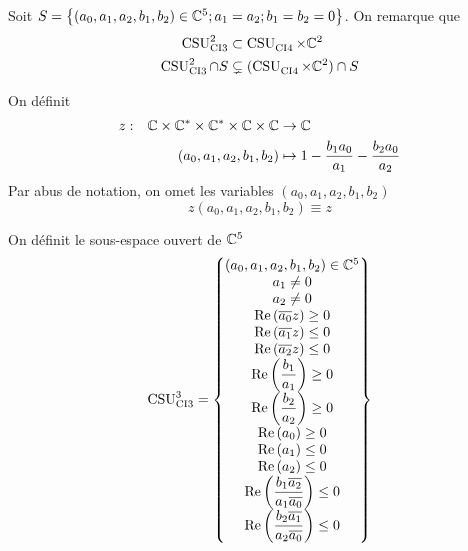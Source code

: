   Soit \(S = \left\lbrace (a_0,a_1,a_2,b_1,b_2) \in \CC^5 ; a_1 = a_2 ; b_1 = b_2 = 0 \right\rbrace \). On remarque que
  \begin{align}
    \CSU[2]{CI3} & \subset \CSU{CI4}\times\CC^2
    \\
    \CSU[2]{CI3}\cap S & \subsetneq (\CSU{CI4}\times\CC^2)\cap S 
  \end{align}

    On définit 
    \begin{equation}
      \label{eq:fonction:z-ci3}
      \fonction{z}{\CC\times\CC^*\times\CC^*\times \CC \times \CC}{\CC}%
        {(a_0,a_1,a_2,b_1,b_2)}{1 - \frac{b_1a_0}{a_1} - \frac{b_2a_0}{a_2}}
    \end{equation}
    Par abus de notation, on omet les variables \( (a_0,a_1,a_2,b_1,b_2)\)
    \begin{equation}
       z(a_0,a_1,a_2,b_1,b_2) \equiv z
    \end{equation}
  \begin{defn}
    \label{def:csu:ci3-3}

    On définit le sous-espace ouvert de \(\CC^5\)
    \begin{equation*}
      \CSU[3]{CI3} = \left\lbrace 
      \begin{matrix}
        (a_0,a_1,a_2,b_1,b_2) \in \CC^5
        \\
        a_1 \not = 0
        \\
        a_2 \not = 0
        \\
        \Re\left(\conj{a_0}z\right) \ge 0
        \\
        \Re\left(\conj{a_1}z\right) \le 0
        \\
        \Re\left(\conj{a_2}z\right) \le 0
        \\
        \Re\left(\frac{b_1}{a_1}\right) \ge 0
        \\
        \Re\left(\frac{b_2}{a_2}\right) \ge 0
        \\
        \Re\left(a_0\right) \ge 0
        \\
        \Re\left(a_1\right) \le 0
        \\
        \Re\left(a_2\right) \le 0
        \\
        \Re\left(\frac{b_1\conj{a_2}}{a_1\conj{a_0}}\right) \le 0
        \\
        \Re\left(\frac{b_2\conj{a_1}}{a_2\conj{a_0}}\right) \le 0
      \end{matrix}
      \right\rbrace
    \end{equation*}
  \end{defn}


